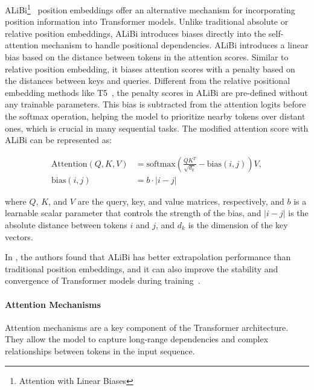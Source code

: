 ALiBi\footnote{Attention with Linear Biases}~\cite{press2022train} position embeddings offer an alternative mechanism for incorporating position information into Transformer models.
Unlike traditional absolute or relative position embeddings, ALiBi introduces biases directly into the self-attention mechanism to handle positional dependencies.
ALiBi introduces a linear bias based on the distance between tokens in the attention scores.
Similar to relative position embedding, it biases attention scores with a penalty based on the distances between keys and queries.
Different from the relative positional embedding methods like T5~\cite{zeng2021pangu}, the penalty scores in ALiBi are pre-defined without any trainable parameters.
This bias is subtracted from the attention logits before the softmax operation, helping the model to prioritize nearby tokens over distant ones, which is crucial in many sequential tasks.
The modified attention score with ALiBi can be represented as:

\begin{equation}
	\begin{aligned}
		\text{Attention}(Q, K, V) & = \text{softmax}\left(\frac{QK^T}{\sqrt{d_k}} - \text{bias}(i,j)\right)V, \\
		\text{bias}(i,j)          & = b \cdotp |i-j|
	\end{aligned}
	\label{eq:alibi}
\end{equation}

\noindent where \(Q\), \(K\), and \(V\) are the query, key, and value matrices, respectively, and \(b\) is a learnable scalar parameter that controls the strength of the bias, and \(|i-j|\) is the absolute distance between tokens \(i\) and \(j\), and \(d_k\) is the dimension of the key vectors.

In \textcite{press2022train}, the authors found that ALiBi has better extrapolation performance than traditional position embeddings, and it can also improve the stability and convergence of Transformer models during training~\cite{workshop2023bloom}.

\paragraph{Attention Mechanisms}
\label{subsubsec:attention-mechanisms}

Attention mechanisms are a key component of the Transformer architecture.
They allow the model to capture long-range dependencies and complex relationships between tokens in the input sequence.

